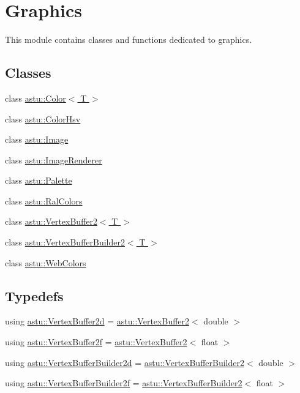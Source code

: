 \hypertarget{group__gfx__group}{}\section{Graphics}
\label{group__gfx__group}


This module contains classes and functions dedicated to graphics.  


\subsection*{Classes}
\begin{DoxyCompactItemize}
\item 
class \hyperlink{classastu_1_1Color}{astu\+::\+Color$<$ T $>$}
\item 
class \hyperlink{classastu_1_1ColorHsv}{astu\+::\+Color\+Hsv}
\item 
class \hyperlink{classastu_1_1Image}{astu\+::\+Image}
\item 
class \hyperlink{classastu_1_1ImageRenderer}{astu\+::\+Image\+Renderer}
\item 
class \hyperlink{classastu_1_1Palette}{astu\+::\+Palette}
\item 
class \hyperlink{classastu_1_1RalColors}{astu\+::\+Ral\+Colors}
\item 
class \hyperlink{classastu_1_1VertexBuffer2}{astu\+::\+Vertex\+Buffer2$<$ T $>$}
\item 
class \hyperlink{classastu_1_1VertexBufferBuilder2}{astu\+::\+Vertex\+Buffer\+Builder2$<$ T $>$}
\item 
class \hyperlink{classastu_1_1WebColors}{astu\+::\+Web\+Colors}
\end{DoxyCompactItemize}
\subsection*{Typedefs}
\begin{DoxyCompactItemize}
\item 
using \hyperlink{group__gfx__group_ga0984042ea57451b25cc703c049481e98}{astu\+::\+Vertex\+Buffer2d} = \hyperlink{classastu_1_1VertexBuffer2}{astu\+::\+Vertex\+Buffer2}$<$ double $>$
\item 
using \hyperlink{group__gfx__group_ga081cf45a441eef100dfbb1e0f64c3826}{astu\+::\+Vertex\+Buffer2f} = \hyperlink{classastu_1_1VertexBuffer2}{astu\+::\+Vertex\+Buffer2}$<$ float $>$
\item 
using \hyperlink{group__gfx__group_ga91f7837593de4dabdf0abf59d5fa1889}{astu\+::\+Vertex\+Buffer\+Builder2d} = \hyperlink{classastu_1_1VertexBufferBuilder2}{astu\+::\+Vertex\+Buffer\+Builder2}$<$ double $>$
\item 
using \hyperlink{group__gfx__group_ga45033e159deced790d4dc3968ad8e878}{astu\+::\+Vertex\+Buffer\+Builder2f} = \hyperlink{classastu_1_1VertexBufferBuilder2}{astu\+::\+Vertex\+Buffer\+Builder2}$<$ float $>$
\end{DoxyCompactItemize}
